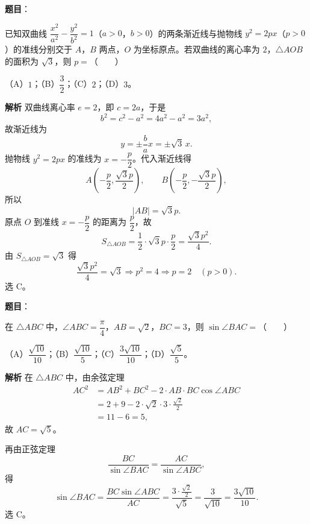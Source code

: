 \begin{answer}

\textbf{题目}：

已知双曲线 $\dfrac{x^2}{a^2}-\dfrac{y^2}{b^2}=1$（$a>0$，$b>0$）的两条渐近线与抛物线 $y^2=2px$（$p>0$）的准线分别交于 $A$，$B$ 两点，$O$ 为坐标原点。若双曲线的离心率为 $2$，$\triangle AOB$ 的面积为 $\sqrt3$，则 $p=$\mbox{（　　）}

（A）$1$；（B）$\dfrac32$；（C）$2$；（D）$3$。

\textbf{解析}
双曲线离心率 $e=2$，即 $c=2a$，于是
\nopagebreak[4]
\[b^2=c^2-a^2=4a^2-a^2=3a^2,\]
故渐近线为
\nopagebreak[4]
\[y=\pm\frac ba x=\pm\sqrt3\,x.\]
抛物线 $y^2=2px$ 的准线为 $x=-\dfrac p2$。代入渐近线得
\nopagebreak[4]
\[A\left(-\frac p2,\frac{\sqrt3p}{2}\right),\qquad
B\left(-\frac p2,-\frac{\sqrt3p}{2}\right),\]
所以
\nopagebreak[4]
\[|AB|=\sqrt3p.\]
原点 $O$ 到准线 $x=-\dfrac p2$ 的距离为 $\dfrac p2$，故
\nopagebreak[4]
\[S_{\triangle AOB}=\frac12\cdot\sqrt3p\cdot\frac p2=\frac{\sqrt3p^2}{4}.\]
由 $S_{\triangle AOB}=\sqrt3$ 得
\nopagebreak[4]
\[\frac{\sqrt3p^2}{4}=\sqrt3\Longrightarrow p^2=4\Longrightarrow p=2\quad(p>0).\]
选 C。


\end{answer}
\begin{answer}

\textbf{题目}：

在 $\triangle ABC$ 中，$\angle ABC=\dfrac{\pi}{4}$，$AB=\sqrt2$，$BC=3$，则 $\sin\angle BAC=$\mbox{（　　）}

（A）$\dfrac{\sqrt{10}}{10}$；（B）$\dfrac{\sqrt{10}}{5}$；（C）$\dfrac{3\sqrt{10}}{10}$；（D）$\dfrac{\sqrt5}{5}$。

\textbf{解析}
在 $\triangle ABC$ 中，由余弦定理
\nopagebreak[4]
\[\begin{aligned}
AC^2&=AB^2+BC^2-2\cdot AB\cdot BC\cos\angle ABC\\
&=2+9-2\cdot\sqrt2\cdot3\cdot\frac{\sqrt2}{2}\\
&=11-6=5,
\end{aligned}\]
故 $AC=\sqrt5$。

再由正弦定理
\nopagebreak[4]
\[\frac{BC}{\sin\angle BAC}=\frac{AC}{\sin\angle ABC},\]
得
\nopagebreak[4]
\[\sin\angle BAC=\frac{BC\sin\angle ABC}{AC}
=\frac{3\cdot\frac{\sqrt2}{2}}{\sqrt5}
=\frac{3}{\sqrt{10}}
=\frac{3\sqrt{10}}{10}.\]
选 C。


\end{answer}
